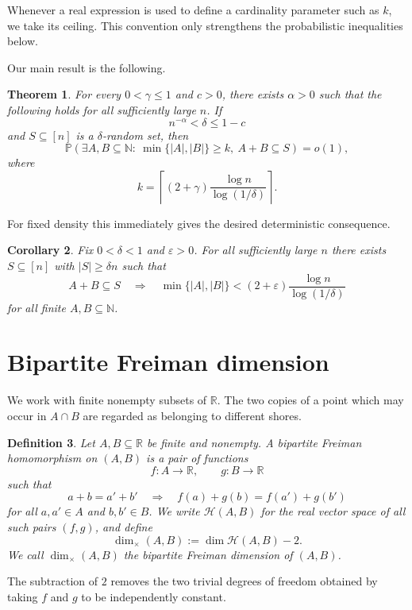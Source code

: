 \documentclass[11pt]{article}
\newtheorem{theorem}{Theorem}[section]
\newtheorem{corollary}[theorem]{Corollary}
\newtheorem{definition}[theorem]{Definition}
\newcommand{\N}{\mathbb{N}}
\newcommand{\R}{\mathbb{R}}
\newcommand{\Prob}{\mathbb{P}}
\newcommand{\cH}{\mathcal{H}}
\newcommand{\dimx}{\dim_{\times}}
\newcommand{\eps}{\varepsilon}
\begin{document}
Whenever a real expression is used to define a cardinality parameter such as $k$, we take its ceiling.  This convention only strengthens the probabilistic inequalities below.

Our main result is the following.

\begin{theorem}\label{thm:random-main}
For every $0<\gamma\le 1$ and $c>0$, there exists $\alpha>0$ such that the following holds for all sufficiently large $n$.  If
\[
 n^{-\alpha}<\delta\le 1-c
\]
and $S\subseteq[n]$ is a $\delta$-random set, then
\[
 \Prob\left(\exists A,B\subseteq\N:\ \min\{|A|,|B|\}\ge k,\ A+B\subseteq S\right)=o(1),
\]
where
\[
 k=\left\lceil(2+\gamma)\frac{\log n}{\log(1/\delta)}\right\rceil.
\]
\end{theorem}

For fixed density this immediately gives the desired deterministic consequence.

\begin{corollary}\label{cor:dense}
Fix $0<\delta<1$ and $\eps>0$.  For all sufficiently large $n$ there exists $S\subseteq[n]$ with $|S|\ge\delta n$ such that
\[
 A+B\subseteq S
 \quad\Longrightarrow\quad
 \min\{|A|,|B|\}< (2+\eps)\frac{\log n}{\log(1/\delta)}
\]
for all finite $A,B\subseteq\N$.
\end{corollary}

\section{Bipartite Freiman dimension}

We work with finite nonempty subsets of $\R$.  The two copies of a point which may occur in $A\cap B$ are regarded as belonging to different shores.

\begin{definition}\label{def:hom}
Let $A,B\subseteq\R$ be finite and nonempty.  A \emph{bipartite Freiman homomorphism} on $(A,B)$ is a pair of functions
\[
 f:A\to\R,\qquad g:B\to\R
\]
such that
\[
 a+b=a'+b'
 \quad\Longrightarrow\quad
 f(a)+g(b)=f(a')+g(b')
\]
for all $a,a'\in A$ and $b,b'\in B$.  We write $\cH(A,B)$ for the real vector space of all such pairs $(f,g)$, and define
\[
 \dimx(A,B):=\dim \cH(A,B)-2.
\]
We call $\dimx(A,B)$ the \emph{bipartite Freiman dimension} of $(A,B)$.
\end{definition}

The subtraction of $2$ removes the two trivial degrees of freedom obtained by taking $f$ and $g$ to be independently constant.
\end{document}
